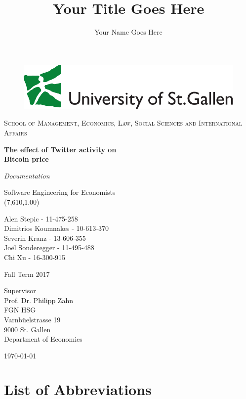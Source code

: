 \documentclass[a4paper,12pt]{article}
\title{Your Title Goes Here}
\author{Your Name Goes Here}
\begin{document}
\begin{titlepage}
	\begin{figure}
	\centering
	\includegraphics[scale=0.32]{logohsg}
	\end{figure}
\centering
\centering
{\scshape\large School of Management, Economics, Law, Social Sciences and International Affairs \par}
\vspace{1.7cm}
{\huge\bfseries The effect of Twitter activity on \\ Bitcoin price\par}
\vspace{1.0cm}
{\Huge\itshape Documentation\par}
\vspace{1.0cm}     
{\Large Software Engineering for Economists \\ (7,610,1.00) \par}
\vspace{1.2cm}
{Alen Stepic - 11-475-258 \\ Dimitrios Koumnakes - 10-613-370 \\ Severin Kranz - 13-606-355 \\ Joël Sonderegger - 11-495-488 \\ Chi Xu - 16-300-915 \par}
\vspace{1.2cm}
Fall Term 2017 \\
\vspace{1.2cm}
{Supervisor\\ Prof. Dr. Philipp Zahn\\ FGN HSG\\ Varnbüelstrasse 19\\ 9000 St. Gallen\\ Department of Economics\par}
\vspace{0.8cm}
{\centering\today\par}
\end{titlepage}

\clearpage

\tableofcontents

\clearpage
    
\listoffigures\bigskip 
\section*{List of Abbreviations} 
\begin{acronym}[ASECRETTT]
\end{acronym}
\end{document}
